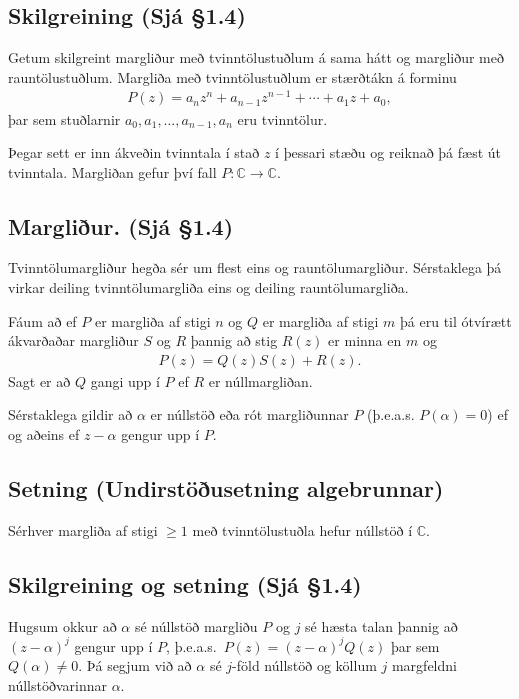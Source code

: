 \documentclass[a4paper,10pt,icelandic]{sphinxmanual}
\begin{document}
\subsection{Skilgreining (Sjá \S{}1.4)}
\label{\detokenize{Kafli01:skilgreining-sja-1-4}}
Getum skilgreint margliður með tvinntölustuðlum á sama hátt og margliður með rauntölustuðlum. Margliða
með tvinntölustuðlum er stærðtákn á forminu
\begin{equation*}
\begin{split}P(z)=a_nz^n+a_{n-1}z^{n-1}+\cdots+a_1z+a_0,\end{split}
\end{equation*}
þar sem stuðlarnir \(a_0, a_1, \ldots, a_{n-1}, a_n\) eru
tvinntölur.

Þegar sett er inn ákveðin tvinntala í stað \(z\) í þessari stæðu og
reiknað þá fæst út tvinntala. Margliðan gefur því fall
\(P:{\mathbb{C}}\rightarrow {\mathbb{C}}\).


\subsection{Margliður. (Sjá \S{}1.4)}
\label{\detokenize{Kafli01:margliur-sja-1-4}}
Tvinntölumargliður hegða sér
um flest eins og rauntölumargliður. Sérstaklega þá virkar deiling
tvinntölumargliða eins og deiling rauntölumargliða.

Fáum að ef \(P\) er margliða af stigi \(n\) og \(Q\) er
margliða af stigi \(m\) þá eru til ótvírætt ákvarðaðar margliður
\(S\) og \(R\) þannig að stig \(R(z)\) er minna en \(m\)
og
\begin{equation*}
\begin{split}P(z)=Q(z)S(z)+R(z).\end{split}
\end{equation*}
Sagt er að \(Q\) gangi upp í \(P\) ef \(R\) er
núllmargliðan.

Sérstaklega gildir að \(\alpha\) er núllstöð eða rót margliðunnar
\(P\) (þ.e.a.s. \(P(\alpha)=0\)) ef og aðeins ef
\(z-\alpha\) gengur upp í \(P\).


\subsection{Setning (Undirstöðusetning algebrunnar)}
\label{\detokenize{Kafli01:setning-undirstousetning-algebrunnar}}
Sérhver margliða af stigi \(\geq 1\) með tvinntölustuðla hefur núllstöð í
\({\mathbb{C}}\).


\subsection{Skilgreining og setning (Sjá \S{}1.4)}
\label{\detokenize{Kafli01:skilgreining-og-setning-sja-1-4}}
Hugsum okkur að \(\alpha\) sé núllstöð margliðu \(P\) og \(j\) sé hæsta talan þannig að
\((z-\alpha)^j\) gengur upp í \(P\),
þ.e.a.s. \(P(z)=(z-\alpha)^jQ(z)\) þar sem
\(Q(\alpha)\neq 0\). Þá segjum við að \(\alpha\) sé
\(j\)-föld núllstöð og köllum \(j\) margfeldni núllstöðvarinnar
\(\alpha\).
\end{document}
